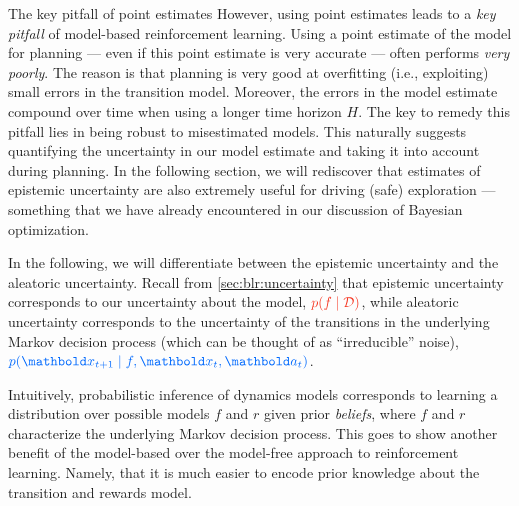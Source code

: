 \begin{rmk}{The key pitfall of point estimates}{}
  However, using point estimates leads to a \emph{key pitfall} of model-based reinforcement learning.
  Using a point estimate of the model for planning --- even if this point estimate is very accurate --- often performs \emph{very poorly}.
  The reason is that planning is very good at overfitting (i.e., exploiting) small errors in the transition model.
  Moreover, the errors in the model estimate compound over time when using a longer time horizon $H$.
  The key to remedy this pitfall lies in being robust to misestimated models.
  This naturally suggests quantifying the uncertainty in our model estimate and taking it into account during planning.
  In the following section, we will rediscover that estimates of epistemic uncertainty are also extremely useful for driving (safe) exploration --- something that we have already encountered in our discussion of Bayesian optimization.
\end{rmk}

In the following, we will differentiate between the epistemic uncertainty and the aleatoric uncertainty.
Recall from \cref{sec:blr:uncertainty} that epistemic uncertainty corresponds to our uncertainty about the model, $\r{p(f \mid \spD)}$, while aleatoric uncertainty corresponds to the uncertainty of the transitions in the underlying Markov decision process (which can be thought of as ``irreducible'' noise), $\b{p(\vx_{t+1} \mid f, \vx_t, \va_t)}$.

Intuitively, probabilistic inference of dynamics models corresponds to learning a distribution over possible models $f$ and $r$ given prior \emph{beliefs}, where $f$ and $r$ characterize the underlying Markov decision process.
This goes to show another benefit of the model-based over the model-free approach to reinforcement learning.
Namely, that it is much easier to encode prior knowledge about the transition and rewards model.

